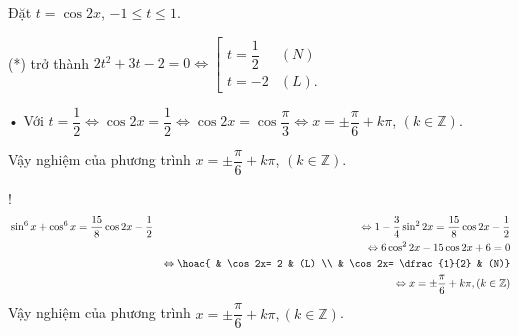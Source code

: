 \begin{bt}
{\begin{listEX}[2]
			Đặt $t = \cos 2x$, $- 1 \le t \le 1$.
			
			(*) trở thành $ 2t^2 + 3t - 2 = 0 \Leftrightarrow 
			\left[\begin{array}{lr}
				t = \dfrac{1}{2}& (N)\\
				t =  - 2& (L).
			\end{array} \right.$
			
			• Với $t=\dfrac{1}{2}\Leftrightarrow 
			\cos 2x=\dfrac{1}{2}\Leftrightarrow 
			\cos 2x=\cos \dfrac{\pi}{3}\Leftrightarrow 
			x=\pm \dfrac{\pi}{6}+k\pi $, $( k\in \mathbb{Z})$.
			
			Vậy nghiệm của phương trình $x=\pm \dfrac{\pi}{6}+k\pi$, $( k\in \mathbb{Z})$.
			\item! 
			\begin{eqnarray*}
				&\sin^6x + \cos^6x = \dfrac{15}{8} \cos 2x - \dfrac{1}{2}
				&\Leftrightarrow 1-\dfrac{3}{4}\sin^22x= \dfrac{15}{8} \cos 2x - \dfrac{1}{2}\\
				&&\Leftrightarrow 6\cos^2 2x-15\cos 2x+6=0\\
				&&\Leftrightarrow 
				\hoac{ & \cos 2x= 2 & (L) \\ & \cos 2x= \dfrac{1}{2} & (N)}\\
				&&\Leftrightarrow x=\pm \dfrac{\pi}{6}+k\pi, (k\in \mathbb{Z})
			\end{eqnarray*}
			Vậy nghiệm của phương trình  
			$  x=\pm \dfrac{\pi}{6}+k\pi, (k\in \mathbb{Z})$. 
		\end{listEX}
	}
\end{bt}

